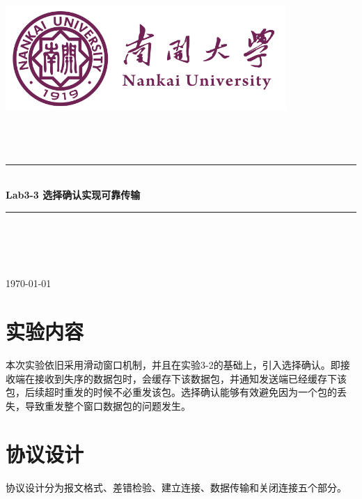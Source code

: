 \documentclass[UTF8,a4paper,10pt]{ctexart}
\newcommand{\HRule}{\rule{\linewidth}{0.5mm}}%
\begin{document}
\begin{titlepage}
    \begin{center}
    \includegraphics[width=0.8\textwidth]{NKU.png}\\[1cm]    
    \textsc{\Huge {} }\\[0.9cm]
    \textsc{\huge {}}\\[0.9cm]
    \textsc{\huge {}}\\[0.8cm]
    \HRule \\[0.9cm]
    { \LARGE \bfseries Lab3-3 选择确认实现可靠传输}\\[0.4cm]
    \HRule \\[2.0cm]
    \centering
    \textsc{\LARGE {}}\\[0.5cm]
    \textsc{\LARGE {}}\\[0.5cm]
    \textsc{\LARGE {}}\\[0.5cm]
    \vfill
    {\Large \today}
    \end{center}
\end{titlepage}



\newpage
\tableofcontents
\setcounter{page}{1}

\vspace{1cm}

\section{实验内容}
本次实验依旧采用滑动窗口机制，并且在实验3-2的基础上，引入选择确认。即接收端在接收到失序的数据包时，会缓存下该数据包，并通知发送端已经缓存下该包，后续超时重发的时候不必重发该包。选择确认能够有效避免因为一个包的丢失，导致重发整个窗口数据包的问题发生。
\vspace{1cm}

\section{协议设计}
协议设计分为报文格式、差错检验、建立连接、数据传输和关闭连接五个部分。
\end{document}

